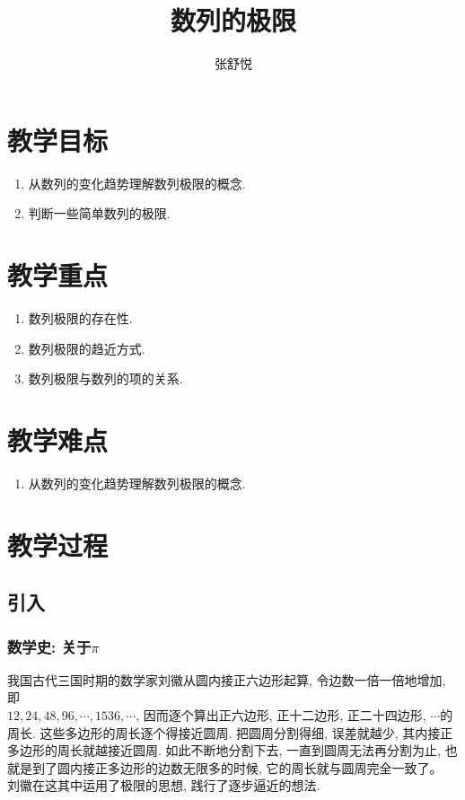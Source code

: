 \documentclass{article}
\begin{document}
\begin{CJK}{UTF8}{gkai}

\title{数列的极限}
\date{}
\author{张舒悦}
\maketitle

\section{教学目标}
\begin{enumerate}
\item 从数列的变化趋势理解数列极限的概念.
\item 判断一些简单数列的极限.
\end{enumerate}

\section{教学重点}
\begin{enumerate}
\item 数列极限的存在性.
\item 数列极限的趋近方式.
\item 数列极限与数列的项的关系.
\end{enumerate}

\section{教学难点}
\begin{enumerate}
\item 从数列的变化趋势理解数列极限的概念.
\end{enumerate}

\section{教学过程}

\subsection{引入}
\subsubsection{数学史: 关于$\pi$}
我国古代三国时期的数学家刘徽从圆内接正六边形起算, 令边数一倍一倍地增加, 即\\$12, 24, 48, 96, \cdots, 1536, \cdots$, 因而逐个算出正六边形, 正十二边形, 正二十四边形, $\cdots$的周长. 这些多边形的周长逐个得接近圆周. 把圆周分割得细, 误差就越少, 其内接正多边形的周长就越接近圆周. 如此不断地分割下去, 一直到圆周无法再分割为止, 也就是到了圆内接正多边形的边数无限多的时候, 它的周长就与圆周完全一致了。\\
刘徽在这其中运用了极限的思想, 践行了逐步逼近的想法.\\


\end{CJK}
\end{document}
